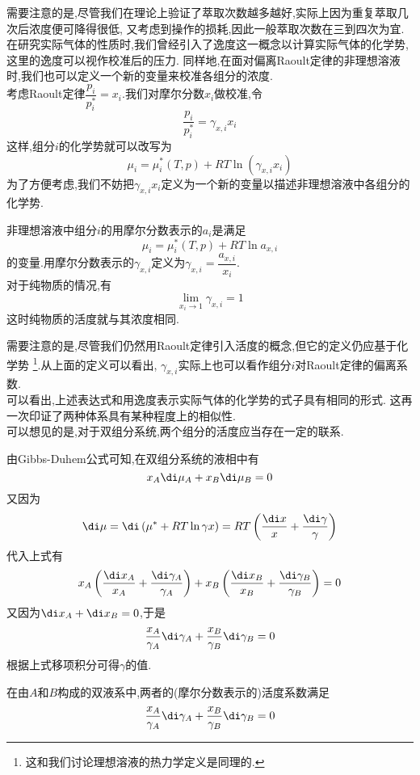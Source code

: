 \documentclass{ctexart}
\begin{document}
需要注意的是,尽管我们在理论上验证了萃取次数越多越好,实际上因为重复萃取几次后浓度便可降得很低,%
又考虑到操作的损耗,因此一般萃取次数在三到四次为宜.\vspace{12pt}\\
\indent 在研究实际气体的性质时,我们曾经引入了逸度这一概念以计算实际气体的化学势,这里的逸度可以视作校准后的压力.%
同样地,在面对偏离Raoult定律的非理想溶液时,我们也可以定义一个新的变量来校准各组分的浓度.\\
\indent 考虑Raoult定律$\dfrac{p_i}{p_i^\ast}=x_i$.我们对摩尔分数$x_i$做校准,令
\[\dfrac{p_i}{p_i^\ast}=\gamma_{x,i}x_i\]
这样,组分$i$的化学势就可以改写为
\[\mu_i=\mu_i^\ast(T,p)+RT\ln\left(\gamma_{x,i}x_i\right)\]
为了方便考虑,我们不妨把$\gamma_{x,i}x_i$定义为一个新的变量以描述非理想溶液中各组分的化学势.
\begin{definition}[4C.6.1 活度与活度系数]
    非理想溶液中组分$i$的用摩尔分数表示的$a_i$是满足
    \[\mu_i=\mu_{i}^\ast(T,p)+RT\ln a_{x,i}\]
    的变量.用摩尔分数表示的$\gamma_{x,i}$定义为$\gamma_{x,i}=\dfrac{a_{x,i}}{x_i}$.\\
    对于纯物质的情况,有
    \[\lim_{x_i\to1}\gamma_{x,i}=1\]
    这时纯物质的活度就与其浓度相同.
\end{definition}
需要注意的是,尽管我们仍然用Raoult定律引入活度的概念,但它的定义仍应基于化学势%
\footnote{这和我们讨论理想溶液的热力学定义是同理的.}.从上面的定义可以看出,%
$\gamma_{x,i}$实际上也可以看作组分$i$对Raoult定律的偏离系数.\\
\indent 可以看出,上述表达式和用逸度表示实际气体的化学势的式子具有相同的形式.%
这再一次印证了两种体系具有某种程度上的相似性.\\
\indent 可以想见的是,对于双组分系统,两个组分的活度应当存在一定的联系.
\begin{derivation}
    由Gibbs-Duhem公式可知,在双组分系统的液相中有
    \[x_A\di\mu_A+x_B\di\mu_B=0\]
    又因为
    \[\di\mu=\di\left(\mu^\ast+RT\ln\gamma x\right)=RT\left(\dfrac{\di x}{x}+\dfrac{\di\gamma}{\gamma}\right)\]
    代入上式有
    \[x_A\left(\dfrac{\di x_A}{x_A}+\dfrac{\di\gamma_A}{\gamma_A}\right)+
    x_B\left(\dfrac{\di x_B}{x_B}+\dfrac{\di\gamma_B}{\gamma_B}\right)=0\]
    又因为$\di x_A+\di x_B=0$,于是
    \[\dfrac{x_A}{\gamma_A}\di\gamma_A+\dfrac{x_B}{\gamma_B}\di\gamma_B=0\]
    根据上式移项积分可得$\gamma$的值.
\end{derivation}
\begin{theorem}[4C.6.2 双组分系统中活度的关系]
    在由$A$和$B$构成的双液系中,两者的(摩尔分数表示的)活度系数满足
    \[\dfrac{x_A}{\gamma_A}\di\gamma_A+\dfrac{x_B}{\gamma_B}\di\gamma_B=0\]

\end{theorem}
\end{document}
